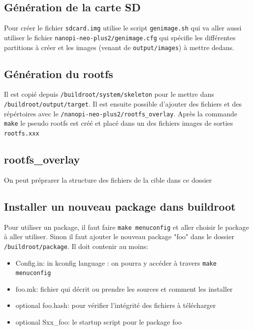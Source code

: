 \subsection{Génération de la carte SD}
Pour créer le fichier \verb!sdcard.img! utilise le script \verb!genimage.sh! qui va aller aussi utiliser le fichier \verb!nanopi-neo-plus2/genimage.cfg! qui spécifie les différentes partitions à créer et les images (venant de \verb!output/images!) à mettre dedans.

\subsection{Génération du rootfs}
Il est copié depuis \verb!/buildroot/system/skeleton! pour le mettre dans \verb!/buildroot/output/target!. Il est ensuite possible d'ajouter des fichiers et des répértoires avec le \verb!/nanopi-neo-plus2/rootfs_overlay!. Après la commande \verb!make! le pseudo rootfs est créé et placé dans un des fichiers images de sorties \verb!rootfs.xxx!

\subsection{rootfs\_overlay}
On peut préprarer la structure des fichiers de la cible dans ce dossier

\subsection{Installer un nouveau package dans buildroot}
Pour utiliser un package, il faut faire \verb!make menuconfig! et aller choisir le package à aller utiliser. Sinon il faut ajouter le nouveau package "foo" dans le dossier \verb!/buildroot/package!. Il doit contenir au moins:
\begin{itemize}
\item Config.in: in kconfig language : on pourra y accéder à travers \verb!make menuconfig!
\item foo.mk: fichier qui décrit ou prendre les sources et comment les installer
\item optional foo.hash: pour vérifier l'intégrité des fichiers à télécharger
\item optional Sxx\_foo: le startup script pour le package foo
\end{itemize}